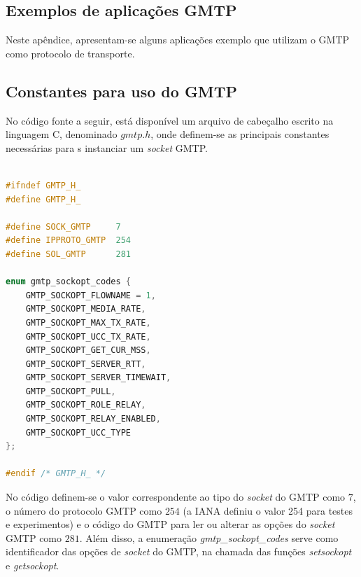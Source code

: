 %
%



\begin{apendicesenv}

\partapendices

\chapter{Exemplos de aplicações GMTP}
\label{ap:aplicacoes}

Neste apêndice, apresentam-se alguns aplicações exemplo que utilizam o GMTP como protocolo de transporte.

\section{Constantes para uso do GMTP}
\label{ap:gmtp.h}

No código fonte a seguir, está disponível um arquivo de cabeçalho escrito na linguagem C, denominado $gmtp.h$, onde definem-se as principais constantes necessárias para s instanciar um \textit{socket} GMTP.

\begin{lstlisting}[language=C++, caption={Constantes e definições para uso das aplicações GMTP}, label={list:gmtp.h}]

#ifndef GMTP_H_
#define GMTP_H_

#define SOCK_GMTP     7
#define IPPROTO_GMTP  254
#define SOL_GMTP      281

enum gmtp_sockopt_codes {
	GMTP_SOCKOPT_FLOWNAME = 1,
	GMTP_SOCKOPT_MEDIA_RATE,
	GMTP_SOCKOPT_MAX_TX_RATE,
	GMTP_SOCKOPT_UCC_TX_RATE,
	GMTP_SOCKOPT_GET_CUR_MSS,
	GMTP_SOCKOPT_SERVER_RTT,
	GMTP_SOCKOPT_SERVER_TIMEWAIT,
	GMTP_SOCKOPT_PULL,
	GMTP_SOCKOPT_ROLE_RELAY,
	GMTP_SOCKOPT_RELAY_ENABLED,
	GMTP_SOCKOPT_UCC_TYPE
};

#endif /* GMTP_H_ */
\end{lstlisting}

No código definem-se o valor correspondente ao tipo do \textit{socket} do GMTP como $7$, o número do protocolo GMTP como $254$ (a IANA definiu o valor 254 para testes e experimentos) e o código do GMTP para ler ou alterar as opções do \textit{socket} GMTP como $281$.
Além disso, a enumeração \textit{gmtp\_sockopt\_codes} serve como identificador das opções de \textit{socket} do GMTP, na chamada das funções \textit{setsockopt} e \textit{getsockopt}.


\end{apendicesenv}
